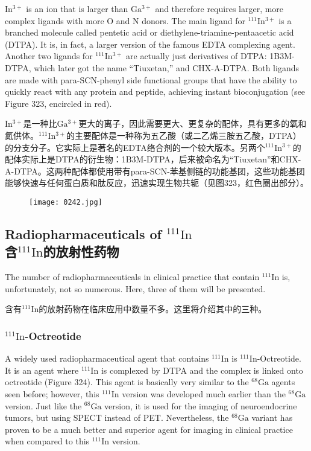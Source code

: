 \documentclass[dvipsnames, svgnames,a4paper,11pt]{article}
\begin{document}
\(\mathrm{In^{3+}}\) is an ion that is larger than \(\mathrm{Ga^{3+}}\) and therefore requires larger, more complex ligands with more O and N donors. The main ligand for \(\mathrm{^{111}In^{3+}}\) is a branched molecule called pentetic acid or diethylene-triamine-pentaacetic acid (DTPA). It is, in fact, a larger version of the famous EDTA complexing agent. Another two ligands for \(\mathrm{^{111}In^{3+}}\) are actually just derivatives of DTPA: 1B3M-DTPA, which later got the name “Tiuxetan,” and CHX-A-DTPA. Both ligands are made with para-SCN-phenyl side functional groups that have the ability to quickly react with any protein and peptide, achieving instant bioconjugation (see Figure 323, encircled in red).

\(\mathrm{In^{3+}}\)是一种比\(\mathrm{Ga^{3+}}\)更大的离子，因此需要更大、更复杂的配体，具有更多的氧和氮供体。\(\mathrm{^{111}In^{3+}}\)的主要配体是一种称为五乙酸（或二乙烯三胺五乙酸，DTPA）的分支分子。它实际上是著名的EDTA络合剂的一个较大版本。另两个\(\mathrm{^{111}In^{3+}}\)的配体实际上是DTPA的衍生物：1B3M-DTPA，后来被命名为“Tiuxetan”和CHX-A-DTPA。这两种配体都使用带有para-SCN-苯基侧链的功能基团，这些功能基团能够快速与任何蛋白质和肽反应，迅速实现生物共轭（见图323，红色圈出部分）。

\begin{figure}[h]
	\centering
    \texttt{[image: 0242.jpg]}  
     \label{fig323}
\end{figure}

\subsection{Radiopharmaceuticals of \(\mathrm{^{111}In}\)\\含\(\mathrm{^{111}In}\)的放射性药物}  
The number of radiopharmaceuticals in clinical practice that contain \(\mathrm{^{111}In}\) is, unfortunately, not so numerous. Here, three of them will be presented.

含有\(\mathrm{^{111}In}\)的放射药物在临床应用中数量不多。这里将介绍其中的三种。

\subsubsection{\(\mathrm{^{111}In}\)-Octreotide}  
A widely used radiopharmaceutical agent that contains \(\mathrm{^{111}In}\) is \(\mathrm{^{111}In}\)-Octreotide. It is an agent where \(\mathrm{^{111}In}\) is complexed by DTPA and the complex is linked onto octreotide (Figure 324). This agent is basically very similar to the \(\mathrm{^{68}Ga}\) agents seen before; however, this \(\mathrm{^{111}In}\) version was developed much earlier than the \(\mathrm{^{68}Ga}\) version. Just like the \(\mathrm{^{68}Ga}\) version, it is used for the imaging of neuroendocrine tumors, but using SPECT instead of PET. Nevertheless, the \(\mathrm{^{68}Ga}\) variant has proven to be a much better and superior agent for imaging in clinical practice when compared to this \(\mathrm{^{111}In}\) version.
\end{document}
